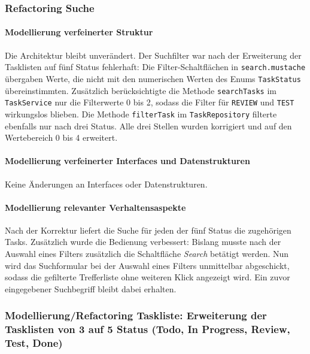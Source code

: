 \documentclass[a4paper,11pt]{article}
\begin{document}
\subsubsection{Refactoring Suche}

\paragraph{Modellierung verfeinerter Struktur}
Die Architektur bleibt unverändert. Der Suchfilter war nach der Erweiterung der Tasklisten auf fünf Status fehlerhaft: Die Filter-Schaltflächen in \texttt{search.mustache} übergaben Werte, die nicht mit den numerischen Werten des Enums \texttt{TaskStatus} übereinstimmten. Zusätzlich berücksichtigte die Methode \texttt{searchTasks} im \texttt{TaskService} nur die Filterwerte 0 bis 2, sodass die Filter für \texttt{REVIEW} und \texttt{TEST} wirkungslos blieben. Die Methode \texttt{filterTask} im \texttt{TaskRepository} filterte ebenfalls nur nach drei Status. Alle drei Stellen wurden korrigiert und auf den Wertebereich 0 bis 4 erweitert.

\paragraph{Modellierung verfeinerter Interfaces und Datenstrukturen}
Keine Änderungen an Interfaces oder Datenstrukturen.

\paragraph{Modellierung relevanter Verhaltensaspekte}
Nach der Korrektur liefert die Suche für jeden der fünf Status die zugehörigen Tasks. Zusätzlich wurde die Bedienung verbessert: Bislang musste nach der Auswahl eines Filters zusätzlich die Schaltfläche \emph{Search} betätigt werden. Nun wird das Suchformular bei der Auswahl eines Filters unmittelbar abgeschickt, sodass die gefilterte Trefferliste ohne weiteren Klick angezeigt wird. Ein zuvor eingegebener Suchbegriff bleibt dabei erhalten.


\subsubsection{Modellierung/Refactoring Taskliste: Erweiterung der Tasklisten von 3 auf 5 Status (Todo, In Progress, Review, Test, Done)}
\end{document}
